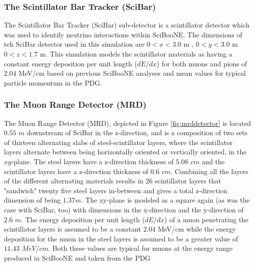 \documentclass[11pt]{article}
\begin{document}
\subsubsection{The Scintillator Bar Tracker (SciBar)} \label{subsubsec:SciBar}
The Scintillator Bar Tracker (SciBar) sub-detector is a scintillator detector which was used to identify neutrino interactions within SciBooNE. The dimensions of teh SciBar detector used in this simulation are $0 < x < 3.0$ m , $0 < y < 3.0$ m $0 < z < 1.7$ m. This simulation models the scintillator materials as having a constant energy deposition per unit length ($dE/dx$) for both muons and pions of $2.04$ MeV/cm based on previous SciBooNE analyses and mean values for typical particle momentum in the PDG.

\subsubsection{The Muon Range Detector (MRD)}\label{subsubsec:MRD}
The Muon Range Detector (MRD), depicted in Figure \ref{fig:mrddetector} is located $0.55$ $m$ downstream of SciBar in the z-direction, and is a composition of two sets of thirteen alternating slabs of steel-scintillator layers, where the scintillator layers alternate between being horizontally oriented or vertically oriented, in the $xy$-plane. The steel layers have a z-direction thickness of $5.08$ $cm$ and the scintillator layers have a z-direction thickness of $0.6$ $cm$. Combining all the layers of the different alternating materials results in 26 scintillator layers that "sandwich" twenty five steel layers in-between and gives a total z-direction dimension of being $1.37 m$. The xy-plane is modeled as a square again (as was the case with SciBar, too) with dimensions in the x-direction and the y-direction of $2.6$ $m$. The energy deposition per unit length ($dE/dx$) of a muon penetrating the scintillator layers is assumed to be a constant $2.04$ MeV/cm while the energy deposition for the muon in the steel layers is assumed to be a greater value of $11.43$ $MeV/cm$. Both these values are typical for muons at the energy range produced in SciBooNE and taken from the PDG
\end{document}
